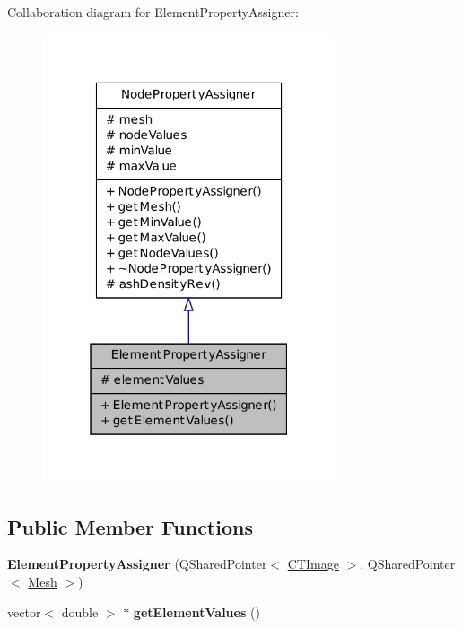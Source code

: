 Collaboration diagram for ElementPropertyAssigner:
\nopagebreak
\begin{figure}[H]
\begin{center}
\leavevmode
\includegraphics[width=244pt]{class_element_property_assigner__coll__graph}
\end{center}
\end{figure}
\subsection*{Public Member Functions}
\begin{DoxyCompactItemize}
\item 
\hypertarget{class_element_property_assigner_a53d1863fbd65b0b3b9b0efc6f534e511}{
{\bfseries ElementPropertyAssigner} (QSharedPointer$<$ \hyperlink{class_c_t_image}{CTImage} $>$, QSharedPointer$<$ \hyperlink{class_mesh}{Mesh} $>$)}
\label{class_element_property_assigner_a53d1863fbd65b0b3b9b0efc6f534e511}

\item 
\hypertarget{class_element_property_assigner_a2275a142849ef077d083bf9b03742e5d}{
vector$<$ double $>$ $\ast$ {\bfseries getElementValues} ()}
\label{class_element_property_assigner_a2275a142849ef077d083bf9b03742e5d}

\end{DoxyCompactItemize}
